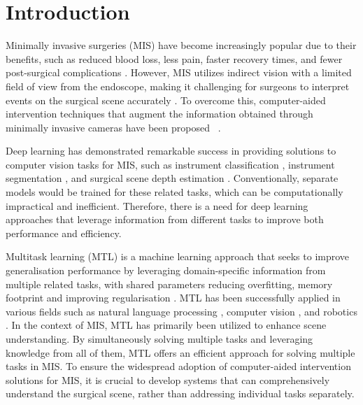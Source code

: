 \documentclass[times,twocolumn,final]{elsarticle}
\begin{document}
\section{Introduction}  \label{sec::introduction}

Minimally invasive surgeries (MIS)
have become increasingly popular due to their benefits, such as reduced blood loss, less pain, faster recovery times, and fewer post-surgical complications \citep{jaffray2005minimally}. However, MIS utilizes indirect vision with a limited field of view from the endoscope, making it challenging for surgeons to interpret events on the surgical scene accurately  \citep{real_time_seg_adverserial}. To overcome this, computer-aided intervention techniques that augment the information obtained through minimally invasive cameras have been proposed ~\citep{vecauteren_cai_4_cai,cv_in_surgery}.

Deep learning has demonstrated remarkable success in providing solutions to computer vision tasks for MIS, such as instrument classification \citep{wang2017deep,mishra2017learning,al2018monitoring}, instrument segmentation \citep{garcia2017toolnet,milletari2018cfcm,pakhomov2020searching,islam2019real}, and surgical scene depth estimation \citep{luo2019details,xiao2020depth,wei2022stereo,luo2022unsupervised}. Conventionally, separate models would be trained for these related tasks, which can be computationally impractical and inefficient. Therefore, there is a need for deep learning approaches that leverage information from different tasks to improve both performance and efficiency.

  

Multitask learning (MTL)
is a machine learning approach that seeks to improve generalisation performance by leveraging domain-specific information from multiple related tasks, with shared parameters reducing overfitting,  memory footprint and improving regularisation \citep{rich_caruana}.
MTL has been successfully applied in various fields such as natural language processing \citep{unified_mtl_nlp}, computer vision \citep{fastrcnn}, and robotics \citep{mtopt}.
In the context of MIS, MTL has primarily been utilized to enhance scene understanding. By simultaneously solving multiple tasks and leveraging knowledge from all of them, MTL offers an efficient approach for solving multiple tasks in MIS.
To ensure the widespread adoption of computer-aided intervention solutions for MIS, it is crucial to develop systems that can comprehensively understand the surgical scene, rather than addressing individual tasks separately.
\end{document}
